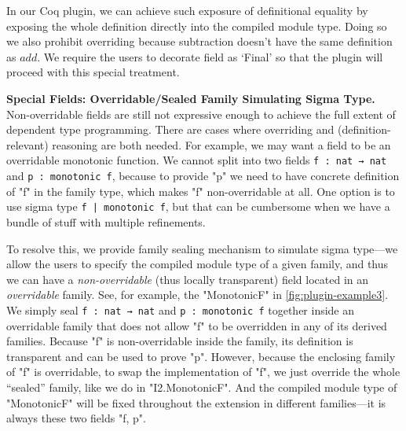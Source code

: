 
In our Coq plugin, we can achieve such exposure of definitional equality by
exposing the whole definition directly into the compiled module type. Doing so we also prohibit overriding because
subtraction doesn't have the same definition as $add$. We require the
users to decorate field as `Final' so that the plugin will proceed with
this special treatment.

\textbf{Special Fields: Overridable/Sealed Family Simulating Sigma Type.} 
Non-overridable fields are still not expressive enough to achieve the full
extent of dependent type programming. There are cases where overriding and
(definition-relevant) reasoning are both needed. For example, we may want a field to be an overridable monotonic function. We cannot split into two fields
\texttt{f : nat → nat} and \texttt{p : monotonic f},
because to provide
"p" we need to have concrete definition of "f" in the family type, which
makes "f" non-overridable at all. One option is to use sigma type
\texttt{{f | monotonic f}}, but that can be cumbersome when we have
a bundle of stuff with multiple refinements. 

To resolve this, we provide family sealing mechanism to simulate sigma type---we allow the
users to specify the compiled module type of a given family, and thus we
can have a \textit{non-overridable} (thus locally transparent) field
located in an \textit{overridable} family.
See, for example, the "MonotonicF" in \cref{fig:plugin-example3}.
We simply seal
\texttt{f : nat → nat} and \texttt{p : monotonic f}
together inside an overridable family that does not allow "f"
to be overridden in any of its derived families.
Because "f" is non-overridable inside the family, its definition is
transparent and can be used to prove "p".
However, because the enclosing family of "f" is overridable, to swap the
implementation of "f", we just override the whole ``sealed'' family,
like we do in "I2.MonotonicF". And the compiled module type of
"MonotonicF" will be fixed throughout the extension in different
families---it is always these two fields "f, p".

